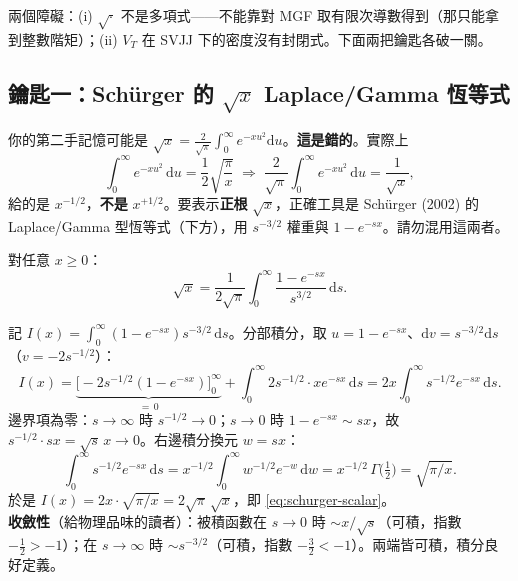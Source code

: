 \documentclass[12pt, a4paper]{article}
\theoremstyle{remark}
\newcommand{\dd}{\mathrm{d}}
\begin{document}
兩個障礙：(i) $\sqrt{\cdot}$ 不是多項式——不能靠對 MGF 取有限次導數得到（那只能拿到整數階矩）；(ii) $V_T$ 在 SVJJ 下的密度沒有封閉式。下面兩把鑰匙各破一關。

\subsection{鑰匙一：Schürger 的 $\sqrt{x}$ Laplace/Gamma 恆等式}

\begin{remarkbox}[title={先排雷：你記憶中的 Gaussian 公式是錯的}]
你的第二手記憶可能是 $\sqrt{x}=\frac{2}{\sqrt\pi}\int_0^\infty e^{-xu^2}\dd u$。\textbf{這是錯的}。實際上
\[
  \int_0^\infty e^{-xu^2}\,\dd u = \frac12\sqrt{\frac{\pi}{x}}
  \;\Longrightarrow\;
  \frac{2}{\sqrt\pi}\int_0^\infty e^{-xu^2}\,\dd u = \frac{1}{\sqrt{x}},
\]
給的是 $x^{-1/2}$，\textbf{不是} $x^{+1/2}$。要表示\textbf{正根} $\sqrt{x}$，正確工具是 Schürger (2002) 的 Laplace/Gamma 型恆等式（下方），用 $s^{-3/2}$ 權重與 $1-e^{-sx}$。請勿混用這兩者。
\end{remarkbox}

\begin{keybox}[title={Schürger (2002) 恆等式（eq A9 的純量核）}]
對任意 $x\ge0$：
\begin{equation}
  \sqrt{x} = \frac{1}{2\sqrt\pi}\int_0^\infty \frac{1-e^{-sx}}{s^{3/2}}\,\dd s.
  \tag{$\star$7}\label{eq:schurger-scalar}
\end{equation}
\end{keybox}

\begin{derivbox}[title={一行自證（Gamma / 分部積分）與收斂性}]
記 $I(x)=\int_0^\infty (1-e^{-sx})s^{-3/2}\,\dd s$。分部積分，取 $u=1-e^{-sx}$、$\dd v=s^{-3/2}\dd s$（$v=-2s^{-1/2}$）：
\[
  I(x) = \underbrace{\Big[-2s^{-1/2}(1-e^{-sx})\Big]_0^\infty}_{=\,0}
  + \int_0^\infty 2s^{-1/2}\cdot x e^{-sx}\,\dd s
  = 2x\int_0^\infty s^{-1/2}e^{-sx}\,\dd s.
\]
邊界項為零：$s\to\infty$ 時 $s^{-1/2}\to0$；$s\to0$ 時 $1-e^{-sx}\sim sx$，故 $s^{-1/2}\cdot sx=\sqrt{s}\,x\to0$。右邊積分換元 $w=sx$：
\[
  \int_0^\infty s^{-1/2}e^{-sx}\,\dd s = x^{-1/2}\!\int_0^\infty w^{-1/2}e^{-w}\,\dd w = x^{-1/2}\,\Gamma\!\big(\tfrac12\big) = \sqrt{\pi/x}.
\]
於是 $I(x)=2x\cdot\sqrt{\pi/x}=2\sqrt\pi\,\sqrt{x}$，即 \eqref{eq:schurger-scalar}。\\[2pt]
\textbf{收斂性}（給物理品味的讀者）：被積函數在 $s\to0$ 時 $\sim x/\sqrt{s}$（可積，指數 $-\frac12>-1$）；在 $s\to\infty$ 時 $\sim s^{-3/2}$（可積，指數 $-\frac32<-1$）。兩端皆可積，積分良好定義。
\end{derivbox}
\end{document}
